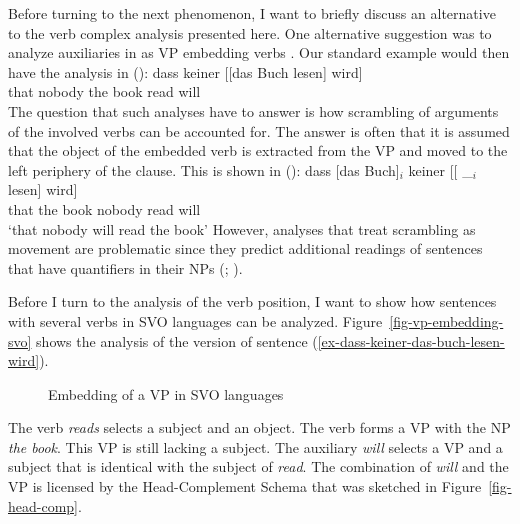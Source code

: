 Before turning to the next phenomenon, I want to briefly discuss an alternative to the verb complex
analysis presented here. One alternative suggestion was to analyze auxiliaries in  as VP
embedding verbs \citep{Wurmbrand2003b}. Our standard example would then have the analysis in ():
\ea
\gll dass keiner [[das Buch lesen] wird]\\
     that nobody \hphantom{[[}the book read will\\
\z
The question that such analyses have to answer is how scrambling of arguments of the involved verbs
can be accounted for. The answer is often that it is assumed that the object of the embedded verb is
extracted from the VP and moved to the left periphery of the clause. This is shown in ():
\ea
\gll dass [das Buch]$_i$ keiner [[ \_$_i$ lesen] wird]\\
     that \spacebr{}the book nobody {} {} read will\\
\glt `that nobody will read the book'
\z
However, analyses that treat scrambling as movement are problematic since they predict additional
readings of sentences that have quantifiers in their NPs (\citealp[]{Kiss2001a};
\citealp[Section~2.6]{Fanselow2001a}).


Before I turn to the analysis of the verb position, I want to show how sentences with several verbs
\label{page-English-Aux-VPs}
in SVO languages can be analyzed. Figure~\vref{fig-vp-embedding-svo} shows the analysis of the  version of sentence
(\ref{ex-dass-keiner-das-buch-lesen-wird}).
\begin{figure}
\caption{\label{fig-vp-embedding-svo}Embedding of a VP in SVO languages}
\end{figure}
The verb \emph{reads} selects a subject and an object. The verb forms a VP with the NP \emph{the
  book}. This VP is still lacking a subject. The auxiliary \emph{will} selects a VP and a subject
that is identical with the subject of \emph{read}. The combination of \emph{will} and the VP is
licensed by the Head-Complement Schema that was sketched in Figure~\vref{fig-head-comp}.

